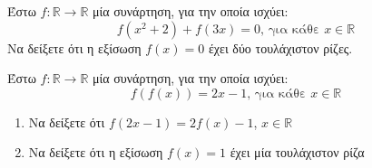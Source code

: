 \documentclass{presentation}
\begin{document}
\begin{askisi}
      Έστω $f:\mathbb{R}\to\mathbb{R}$ μία συνάρτηση, για την οποία ισχύει:
      $$f(x^2+2)+f(3x)=0 \text{, για κάθε } x\in\mathbb{R}$$
      Να δείξετε ότι η εξίσωση $f(x)=0$ έχει δύο τουλάχιστον ρίζες.

\end{askisi}

\begin{askisi}
      Έστω $f:\mathbb{R}\to\mathbb{R}$ μία συνάρτηση, για την οποία ισχύει:
      $$f\left(f(x)\right)=2x-1\text{, για κάθε } x\in\mathbb{R}$$
      \begin{enumerate}
            \item<1-> Να δείξετε ότι $f(2x-1)=2f(x)-1$, $x\in\mathbb{R}$
            \item<2-> Να δείξετε ότι η εξίσωση $f(x)=1$ έχει μία τουλάχιστον ρίζα
      \end{enumerate}

\end{askisi}
\end{document}
